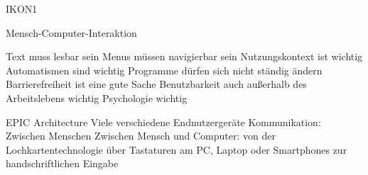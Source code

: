 \documentclass[12pt]{article}
\begin{document}
IKON1

Mensch-Computer-Interaktion

Text muss lesbar sein
Menus müssen navigierbar sein
Nutzungskontext ist wichtig
Automatismen sind wichtig
Programme dürfen sich nicht ständig ändern
Barrierefreiheit ist eine gute Sache
Benutzbarkeit auch außerhalb des Arbeitslebens wichtig
Psychologie wichtig

EPIC Architecture
Viele verschiedene Endnutzergeräte
Kommunikation:
Zwischen Menschen
Zwischen Mensch und Computer:
    von der Lochkartentechnologie
    über Tastaturen am PC, Laptop oder Smartphones
    zur handschriftlichen Eingabe
\end{document}
